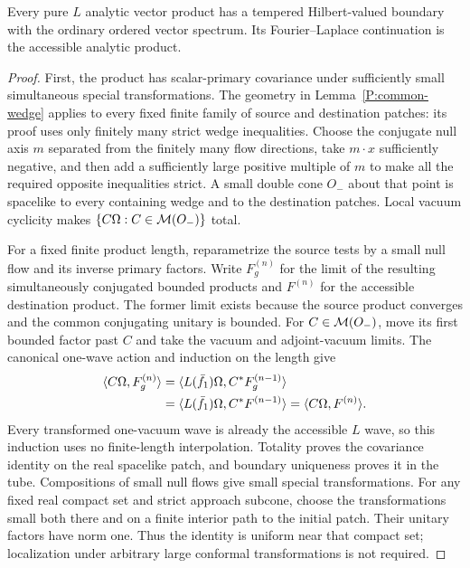 \begin{proposition}\label{R:pure-products}
Every pure $L$ analytic vector product has a tempered Hilbert-valued
boundary with the ordinary ordered vector spectrum.  Its Fourier--Laplace
continuation is the accessible analytic product.
\end{proposition}

\begin{proof}
First, the product has scalar-primary covariance under sufficiently
small simultaneous special transformations.  The geometry in
Lemma~\ref{P:common-wedge} applies to every fixed finite family of
source and destination patches: its proof uses only finitely many
strict wedge inequalities.  Choose the conjugate null axis $m$ separated from the
finitely many flow directions, take $m\cdot x$ sufficiently negative,
and then add a sufficiently large positive multiple of $m$ to make
all the required opposite inequalities strict.  A small double cone
$O_-$ about that point is spacelike to every containing wedge and to
the destination patches.  Local vacuum cyclicity makes
$\{C\Omega:C\in\mathcal M(O_-)\}$ total.

For a fixed finite product length, reparametrize the source tests by
a small null flow and its inverse primary factors.  Write $F_g^{(n)}$
for the limit of the resulting simultaneously conjugated bounded
products and $F^{(n)}$ for the accessible destination product.  The
former limit exists because the source product converges and the
common conjugating unitary is bounded.  For $C\in\mathcal M(O_-)$, move
its first bounded factor past $C$ and take the vacuum and
adjoint-vacuum limits.  The canonical one-wave action and induction
on the length give
\begin{align}\label{R:all-length-recursion}
 \langle C\Omega,F_g^{(n)}\rangle
   &=\langle L(\bar f_1)\Omega,C^*F_g^{(n-1)}\rangle\\
   &=\langle L(\bar f_1)\Omega,C^*F^{(n-1)}\rangle
    =\langle C\Omega,F^{(n)}\rangle.\notag
\end{align}
Every transformed one-vacuum wave is already the accessible $L$
wave, so this induction uses no finite-length interpolation.  Totality
proves the covariance identity on the real spacelike patch, and
boundary uniqueness proves it in the tube.  Compositions of small
null flows give small special transformations.  For any fixed real
compact set and strict approach subcone, choose the transformations
small both there and on a finite interior path to the initial patch.
Their unitary factors have norm one.  Thus the identity is uniform
near that compact set; localization under arbitrary large conformal
transformations is not required.


\end{proof}
